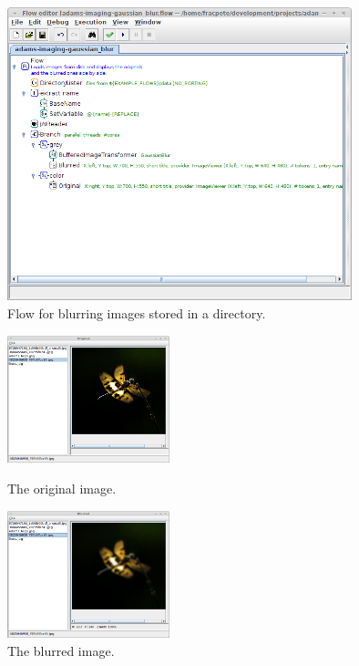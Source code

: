 \documentclass[a4paper]{book}
\begin{document}
\begin{figure}[htb]
  \centering
  \includegraphics[width=10.0cm]{images/adams-blur-flow.png}
  \caption{Flow for blurring images stored in a directory.}
  \label{adams-blur-flow}
\end{figure}

\begin{figure}[htb]
  \begin{minipage}[b]{0.48\linewidth}
  \centering
  \includegraphics[height=3.7cm]{images/adams-blur-output-original.png}
  \caption{The original image.}
  \label{adams-blur-output-original}
  \end{minipage}%
  \begin{minipage}[b]{0.48\linewidth}
  \centering
  \includegraphics[height=3.7cm]{images/adams-blur-output-blurred.png}
  \caption{The blurred image.}
  \label{adams-blur-output-blurred}
  \end{minipage}
\end{figure}
\end{document}
